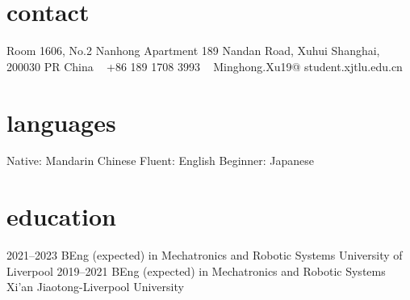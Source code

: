 \documentclass[]{cv-style}          %
\begin{document}
\lastupdated


\begin{aside}
%
\section{contact}
Room 1606, No.2
Nanhong Apartment
189 Nandan Road, Xuhui
Shanghai, 200030
PR China
~
+86 189 1708 3993
~
Minghong.Xu19@
student.xjtlu.edu.cn
%
\section{languages}
Native: Mandarin Chinese
Fluent: English
Beginner: Japanese
\end{aside}


\section{education}

\begin{entrylist}
\entry
{2021--2023}
{BEng (expected) {\normalfont in Mechatronics and Robotic Systems}}
{University of Liverpool}
{\vspace{-0.3cm}}
\entry
{2019--2021}
{BEng (expected) {\normalfont in Mechatronics and Robotic Systems}}
{Xi'an Jiaotong-Liverpool University}

\end{entrylist}

\end{document}
